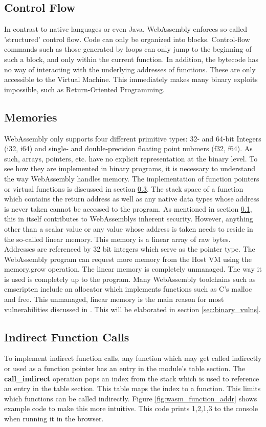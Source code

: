 \documentclass[sigconf]{acmart}
\begin{document}
\subsection{Control Flow}
\label{sec:wasm_control_flow}
In contrast to native languages or even Java, WebAssembly enforces so-called 'structured' control flow. Code can only be organized into blocks. Control-flow commands such as those generated by loops can only jump to the beginning of such a block, and only within the current function. In addition, the bytecode has no way of interacting with the underlying addresses of functions. These are only accessible to the Virtual Machine. This immediately makes many binary exploits impossible, such as Return-Oriented Programming. 

\subsection{Memories} 
\label{sec:memories}
WebAssembly only supports four different primitive types: 32- and 64-bit Integers (i32, i64) and single- and double-precision floating point nubmers (f32, f64). As such, arrays, pointers, etc. have no explicit representation at the binary level. To see how they are implemented in binary programs, it is necessary to understand the way WebAssembly handles memory. The implementation of function pointers or virtual functions is discussed in section \ref{sec:indirect_calls}. The stack space of a function which contains the return address as well as any native data types whose address is never taken cannot be accessed to the program. As mentioned in section \ref{sec:wasm_control_flow}, this in itself contributes to WebAssemblys inherent security. However, anything other than a scalar value or any value whose address is taken needs to reside in the so-called linear memory. This memory is a linear array of raw bytes. Addresses are referenced by 32 bit integers which serve as the pointer type. The WebAssembly program can request more memory from the Host VM using the memory.grow operation. The linear memory is completely unmanaged. The way it is used is completely up to the program. Many WebAssembly toolchains such as emscripten include an allocator which implements functions such as C's malloc and free. This unmanaged, linear memory is the main reason for most vulnerabilities discussed in \cite{lehmann_everything_2020}. This will be elaborated in section \ref{sec:binary_vulns}.

\subsection{Indirect Function Calls} 
\label{sec:indirect_calls}
To implement indirect function calls, any function which may get called indirectly or used as a function pointer has an entry in the module's table section. The \textbf{call\_indirect} operation pops an index from the stack which is used to reference an entry in the table section. This table maps the index to a function. This limits which functions can be called indirectly. Figure \ref{fig:wasm_function_addr} shows example code to make this more intuitive. This code prints 1,2,1,3 to the console when running it in the browser.
\end{document}
